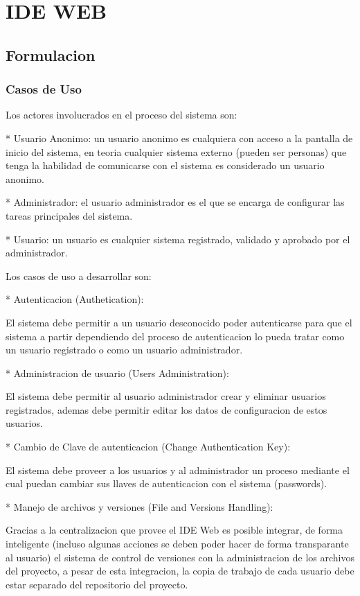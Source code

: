 
\section{IDE WEB}
\subsection{Formulacion}
\subsubsection{Casos de Uso}

Los actores involucrados en el proceso del sistema son:

* Usuario Anonimo: un usuario anonimo es cualquiera con acceso a la pantalla de inicio del sistema, en teoria cualquier sistema externo (pueden ser personas) que tenga la habilidad de comunicarse con el sistema es considerado un usuario anonimo.

* Administrador: el usuario administrador es el que se encarga de configurar las tareas principales del sistema.

* Usuario: un usuario es cualquier sistema registrado, validado y aprobado por el administrador.

Los casos de uso a desarrollar son:


* Autenticacion (Authetication):

El sistema debe permitir a un usuario desconocido poder autenticarse para que el sistema a partir dependiendo del proceso de autenticacion lo pueda tratar como un usuario registrado o como un usuario administrador.

* Administracion de usuario (Users Administration):

El sistema debe permitir al usuario administrador crear y eliminar usuarios registrados, ademas debe permitir editar los datos de configuracion de estos usuarios.

* Cambio de Clave de autenticacion (Change Authentication Key):

El sistema debe proveer a los usuarios y al administrador un proceso mediante el cual puedan cambiar sus llaves de autenticacion con el sistema (passwords).


* Manejo de archivos y versiones (File and Versions Handling):

Gracias a la centralizacion que provee el IDE Web es posible integrar, de forma inteligente (incluso algunas acciones se deben poder hacer de forma transparante al usuario) el sistema de control de versiones con la administracion de los archivos del proyecto, a pesar de esta integracion, la copia de trabajo de cada usuario debe estar separado del repositorio del proyecto.

